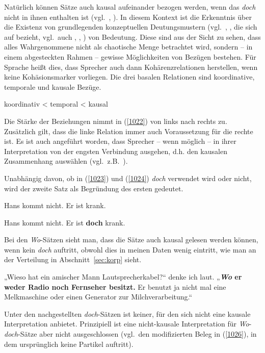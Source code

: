 Natürlich können Sätze auch kausal aufeinander bezogen werden, wenn das \textit{doch} nicht in ihnen enthalten ist (vgl.\ \citealt[168]{Oennerfors1997}, \citealt[171]{Pittner2011}). In diesem Kontext ist die Erkenntnis über die Existenz von  grundlegenden konzeptuellen Deutungsmustern (vgl.\ \citealt[228--229]{Linke2001}, \citealt[26--28]{Averintseva-Klisch2013}, die sich auf \citet{Hume1955[1748]} bezieht, vgl.\ auch \citealt[6]{Sanders1992}, \citealt[339--340]{Fabricius-Hansen2000}, \citealt{Kehler2002, Kehler2004}) von Bedeutung. Diese sind aus der Sicht zu sehen, dass alles Wahrgenommene nicht als chaotische Menge betrachtet wird, sondern – in einem abgesteckten Rahmen – gewisse Möglichkeiten von Bezügen bestehen. Für Sprache heißt dies, dass Sprecher auch dann Kohärenzrelationen  herstellen, wenn keine Kohäsionsmarker  vorliegen. Die drei basalen Relationen sind koordinative, temporale und kausale Bezüge.

\begin{exe}
	\ex\label{1022} 
	koordinativ < temporal < kausal
\end{exe}
Die Stärke der Beziehungen nimmt in (\ref{1022}) von links nach rechts zu. Zusätz\-lich gilt, dass die linke Relation immer auch Voraussetzung für die rechte ist. Es ist auch angeführt worden, dass Sprecher – wenn möglich – in ihrer Interpretation von der engsten Verbindung ausgehen, d.h. den kausalen Zusammenhang auswählen (vgl.\ z.B.\ \citealt[58, Fn 6, 61--62]{Breindl2006}).

Unabhängig davon, ob in (\ref{1023}) und (\ref{1024}) \textit{doch} verwendet wird oder nicht, wird der zweite Satz als Begründung des ersten gedeutet.

\begin{exe}
	\ex\label{1023} 
	Hans kommt nicht. Er ist krank.
\end{exe}
\begin{exe}
	\ex\label{1024} 
	Hans kommt nicht. Er ist \textbf{doch} krank.
	\hfill\hbox{\citep[168]{Oennerfors1997}}
\end{exe}
Bei den \textit{Wo}-Sätzen sieht man, dass die Sätze auch kausal gelesen werden können, wenn kein \textit{doch} auftritt, obwohl dies in meinen Daten wenig eintritt, wie man an der Verteilung in Abschnitt~\ref{sec:korp} sieht.

\begin{exe}
	\ex\label{1025}
	  
	„Wieso hat ein amischer Mann Lautsprecherkabel?“ denke ich laut. „\textbf{\textit{Wo} er weder Radio noch Fernseher besitzt.} Er benutzt ja 			nicht mal eine Melkmaschine oder einen Generator zur Milchverarbeitung.“ 
	\newline
	\hbox{}\hfill\hbox{\citet[53]{Castillo2011}}
\end{exe}
Unter den nachgestellten \textit{doch}-Sätzen ist keiner, für den sich nicht eine kausale Interpretation anbietet. Prinzipiell ist eine nicht-kausale Interpretation für \textit{Wo}-\textit{doch}-Sätze aber nicht ausgeschlossen (vgl.\ den modifizierten Beleg in (\ref{1026}), in dem ursprünglich keine Partikel auftritt).
	
